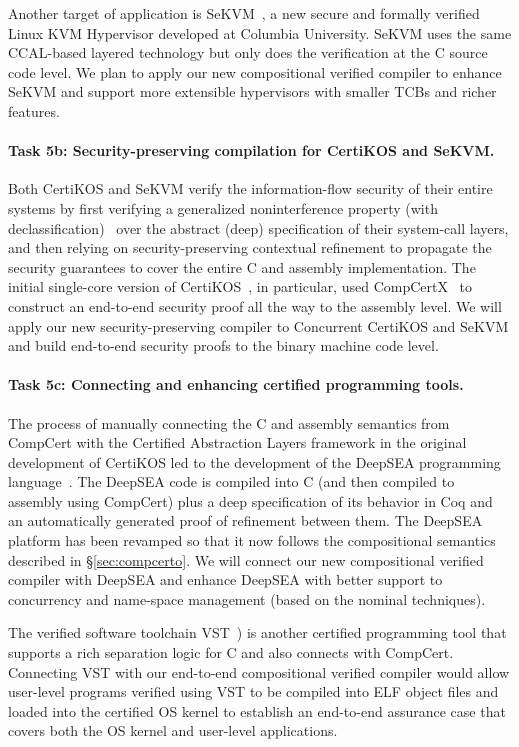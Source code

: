 Another target of application is SeKVM~\cite{sekvm21a,sekvm21b,tao21},
a new secure and formally verified Linux KVM Hypervisor developed at
Columbia University. SeKVM uses the same CCAL-based layered technology 
but only does the verification at the C source code level. We plan to
apply our new compositional verified compiler to enhance SeKVM and support
more extensible hypervisors with smaller TCBs and richer features.

\vspace*{-2ex}
\paragraph*{Task 5b: Security-preserving compilation for CertiKOS and SeKVM.}
Both CertiKOS and SeKVM verify the information-flow security of their
entire systems by first verifying a generalized noninterference
property (with declassification)~\cite{costanzo16} over the abstract
(deep) specification of their system-call layers, and then relying on
security-preserving contextual refinement to propagate the security
guarantees to cover the entire C and assembly implementation. The
initial single-core version of CertiKOS~\cite{costanzo16}, in
particular, used CompCertX~\cite{dscal15} to construct an end-to-end
security proof all the way to the assembly level.  We will apply our
new security-preserving compiler to Concurrent CertiKOS and SeKVM and
build end-to-end security proofs to the binary machine code level.

\vspace*{-2ex}
\paragraph*{Task 5c: Connecting and enhancing certified programming tools.}
The process of manually connecting the C and assembly semantics from
CompCert with the Certified Abstraction Layers framework in the
original development of CertiKOS led to the development of the DeepSEA
programming language~\cite{deepsea19}.  The DeepSEA code is compiled
into C (and then compiled to assembly using CompCert) plus a deep
specification of its behavior in Coq and an automatically generated
proof of refinement between them. The DeepSEA platform has been
revamped so that it now follows the compositional semantics described
in \S\ref{sec:compcerto}. We will connect our new compositional
verified compiler with DeepSEA and enhance DeepSEA with better support
to concurrency and name-space management (based on the nominal techniques).

The verified software toolchain VST~\cite{appel11:vst}) is another
certified programming tool that supports a rich separation logic for C
and also connects with CompCert. Connecting VST with our end-to-end
compositional verified compiler would allow user-level programs
verified using VST to be compiled into ELF object files and loaded
into the certified OS kernel to establish an end-to-end assurance case
that covers both the OS kernel and user-level applications.

